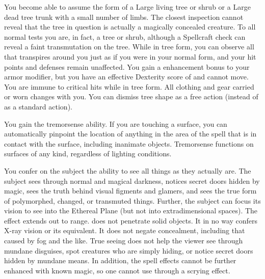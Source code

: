 \spelldur{\durext \dismissable}
\spelleffect You become able to assume the form of a Large living tree or shrub or a Large dead tree trunk with a small number of limbs. The closest inspection cannot reveal that the tree in question is actually a magically concealed creature. To all normal tests you are, in fact, a tree or shrub, although a Spellcraft check can reveal a faint transmutation on the tree. While in tree form, you can observe all that transpires around you just as if you were in your normal form, and your hit points and defenses remain unaffected. You gain a  enhancement bonus to your armor modifier, but you have an effective Dexterity score of  and cannot move. You are immune to critical hits while in tree form. All clothing and gear carried or worn changes with you.
\spellnotes You can dismiss tree shape as a free action (instead of as a standard action).

\spelleffect You gain the tremorsense ability. If you are touching a surface, you can automatically pinpoint the location of anything in the area of the spell that is in contact with the surface, including inanimate objects.
\spellnotes Tremorsense functions on surfaces of any kind, regardless of lighting conditions.

\spelldur{\durshort}
\spelleffect You confer on the subject the ability to see all things as they actually are. The subject sees through normal and magical darkness, notices secret doors hidden by magic, sees the truth behind visual figments and glamers, and sees the true form of polymorphed, changed, or transmuted things. Further, the subject can focus its vision to see into the Ethereal Plane (but not into extradimensional spaces). The effect extends out to \rngmed range.
\spellnotes {} does not penetrate solid objects. It in no way confers X-ray vision or its equivalent. It does not negate concealment, including that caused by fog and the like. True seeing does not help the viewer see through mundane disguises, spot creatures who are simply hiding, or notice secret doors hidden by mundane means. In addition, the spell effects cannot be further enhanced with known magic, so one cannot use  through a scrying effect.

